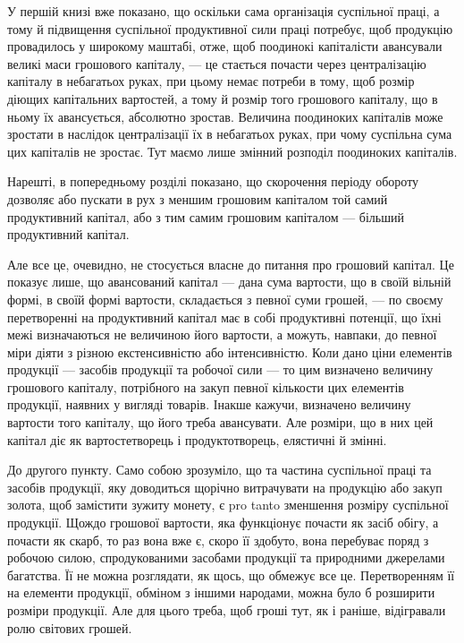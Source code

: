 У першій книзі вже показано, що оскільки сама організація суспільної
праці, а тому й підвищення суспільної продуктивної сили праці потребує,
щоб продукцію провадилось у широкому маштабі, отже, щоб поодинокі
капіталісти авансували великі маси грошового капіталу, — це
стається почасти через централізацію капіталу в небагатьох руках, при
цьому немає потреби в тому, щоб розмір діющих капітальних вартостей,
а тому й розмір того грошового капіталу, що в ньому їх авансується,
абсолютно зростав. Величина поодиноких капіталів може зростати в наслідок
централізації їх в небагатьох руках, при чому суспільна сума цих
капіталів не зростає. Тут маємо лише змінний розподіл поодиноких капіталів.

Нарешті, в попередньому розділі показано, що скорочення періоду
обороту дозволяє або пускати в рух з меншим грошовим капіталом той
самий продуктивний капітал, або з тим самим грошовим капіталом —
більший продуктивний капітал.

Але все це, очевидно, не стосується власне до питання про грошовий
капітал. Це показує лише, що авансований капітал — дана сума вартости,
що в своїй вільній формі, в своїй формі вартости, складається з
певної суми грошей, — по своєму перетворенні на продуктивний капітал
має в собі продуктивні потенції, що їхні межі визначаються не величиною
його вартости, а можуть, навпаки, до певної міри діяти з різною екстенсивністю
або інтенсивністю. Коли дано ціни елементів продукції — засобів
продукції та робочої сили — то цим визначено величину грошового
капіталу, потрібного на закуп певної кількости цих елементів продукції,
наявних у вигляді товарів. Інакше кажучи, визначено величину вартости
того капіталу, що його треба авансувати. Але розміри, що в них цей
капітал діє як вартостетворець і продуктотворець, елястичні й змінні.

До другого пункту. Само собою зрозуміло, що та частина суспільної
праці та засобів продукції, яку доводиться щорічно витрачувати
на продукцію або закуп золота, щоб замістити зужиту монету, є pro
tanto зменшення розміру суспільної продукції. Щождо грошової вартости,
яка функціонує почасти як засіб обігу, а почасти як скарб, то раз
вона вже є, скоро її здобуто, вона перебуває поряд з робочою силою,
спродукованими засобами продукції та природними джерелами багатства.
Її не можна розглядати, як щось, що обмежує все це. Перетворенням її
на елементи продукції, обміном з іншими народами, можна було б розширити
розміри продукції. Але для цього треба, щоб гроші тут, як і
раніше, відігравали ролю світових грошей.

